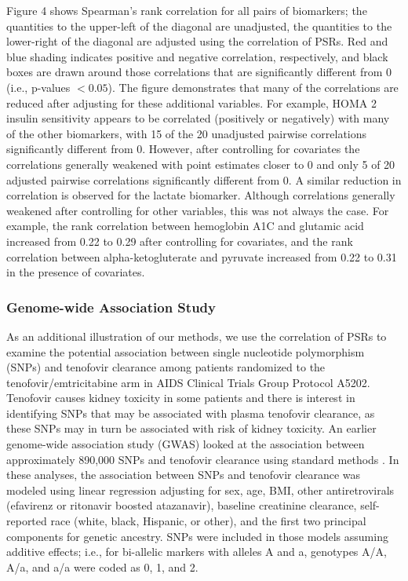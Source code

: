 \documentclass[12pt, usenatbib]{article}
\begin{document}
Figure 4 shows Spearman's rank correlation for all pairs of biomarkers; the quantities to the upper-left of the diagonal are unadjusted, the quantities to the lower-right of the diagonal are adjusted using the correlation of PSRs.  Red and blue shading indicates positive and negative correlation, respectively, and black boxes are drawn around those correlations that are significantly different from 0 (i.e., p-values $<0.05$).  The figure demonstrates that many of the correlations are reduced after adjusting for these additional variables.  For example, HOMA 2 insulin sensitivity appears to be correlated (positively or negatively) with many of the other biomarkers, with 15 of the 20 unadjusted pairwise correlations significantly different from 0.  However, after controlling for covariates the correlations generally weakened with point estimates closer to 0 and only 5 of 20 adjusted pairwise correlations significantly different from 0.  A similar reduction in correlation is observed for the lactate biomarker.  Although correlations generally weakened after controlling for other variables, this was not always the case.  For example, the rank correlation between hemoglobin A1C and glutamic acid increased from 0.22 to 0.29 after controlling for covariates, and the rank correlation between alpha-ketogluterate and pyruvate increased from 0.22 to 0.31 in the presence of covariates.



\subsubsection{Genome-wide Association Study}

As an additional illustration of our methods, we use the correlation of PSRs to examine the potential association between single nucleotide polymorphism (SNPs) and tenofovir clearance among patients randomized to the tenofovir/emtricitabine arm in AIDS Clinical Trials Group Protocol A5202.  Tenofovir causes kidney toxicity in some patients and there is interest in identifying SNPs that may be associated with plasma tenofovir clearance, as these SNPs may in turn be associated with risk of kidney toxicity.  An earlier genome-wide association study (GWAS) looked at the association between approximately 890,000 SNPs and tenofovir clearance using standard methods \citep{wanga2015}.  In these analyses, the association between SNPs and tenofovir clearance was modeled using linear regression adjusting for sex, age, BMI, other antiretrovirals (efavirenz or ritonavir boosted atazanavir), baseline creatinine clearance, self-reported race (white, black, Hispanic, or other), and the first two principal components for genetic ancestry.  SNPs were included in those models assuming additive effects; i.e., for bi-allelic markers with alleles A and a, genotypes A/A, A/a, and a/a were coded as 0, 1, and 2.  
\end{document}
